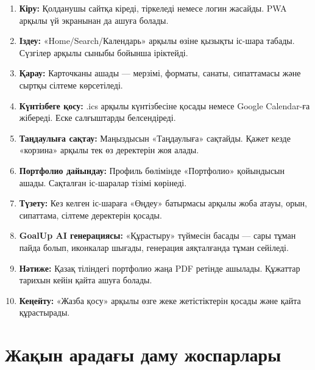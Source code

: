 \documentclass[12pt,a4paper]{article}
\begin{document}
\begin{enumerate}[leftmargin=*]
    \item \textbf{Кіру:} Қолданушы сайтқа кіреді, тіркеледі немесе логин жасайды. PWA арқылы үй экранынан да ашуға болады.

    \item \textbf{Іздеу:} «Home/Search/Календарь» арқылы өзіне қызықты іс-шара табады. Сүзгілер арқылы сыныбы бойынша іріктейді.

    \item \textbf{Қарау:} Карточканы ашады — мерзімі, форматы, санаты, сипаттамасы және сыртқы сілтеме көрсетіледі.

    \item \textbf{Күнтізбеге қосу:} .ics арқылы күнтізбесіне қосады немесе Google Calendar-ға жібереді. Еске салғыштарды белсендіреді.

    \item \textbf{Таңдаулыға сақтау:} Маңыздысын «Таңдаулыға» сақтайды. Қажет кезде «корзина» арқылы тек өз деректерін жоя алады.

    \item \textbf{Портфолио дайындау:} Профиль бөлімінде «Портфолио» қойындысын ашады. Сақталған іс-шаралар тізімі көрінеді.

    \item \textbf{Түзету:} Кез келген іс-шараға «Өңдеу» батырмасы арқылы жоба атауы, орын, сипаттама, сілтеме деректерін қосады.

    \item \textbf{GoalUp AI генерациясы:} «Құрастыру» түймесін басады — сары тұман пайда болып, иконкалар шығады, генерация аяқталғанда тұман сейіледі.

    \item \textbf{Нәтиже:} Қазақ тіліндегі портфолио жаңа PDF ретінде ашылады. Құжаттар тарихын кейін қайта ашуға болады.

    \item \textbf{Кеңейту:} «Жазба қосу» арқылы өзге жеке жетістіктерін қосады және қайта құрастырады.
\end{enumerate}

\section{Жақын арадағы даму жоспарлары}
\end{document}

